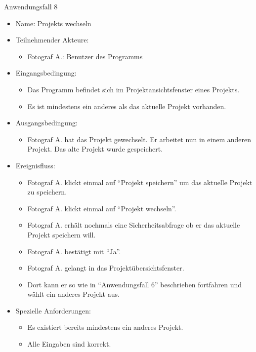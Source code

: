 \begin{itemize}
		\begin{description}
		\item[Anwendungsfall 8]
	\end{description}
	
		\begin{itemize}
			\item Name: Projekts wechseln
			\item Teilnehmender Akteure:
			\begin{itemize}
				\item	Fotograf A.: Benutzer des Programms		
			\end{itemize}
			\item Eingangsbedingung:
			\begin{itemize}
				\item	Das Programm befindet sich im Projektansichtsfenster eines Projekts.
				\item Es ist mindestens ein anderes als das aktuelle Projekt vorhanden.			
			\end{itemize}
			\item Ausgangsbedingung:
			\begin{itemize}
				\item	Fotograf A. hat das Projekt gewechselt. Er arbeitet nun in einem anderen Projekt. Das alte Projekt wurde gespeichert.
			\end{itemize}
			\item Ereignisfluss:
			\begin{itemize}
			  \item Fotograf A. klickt einmal auf "`Projekt speichern"' um das aktuelle Projekt zu speichern.
				\item Fotograf A. klickt einmal auf "`Projekt wechseln"'.
				\item Fotograf A. erhält nochmals eine Sicherheitsabfrage ob er das aktuelle Projekt speichern will.
				\item Fotograf A. bestätigt mit "`Ja"'.
				\item Fotograf A. gelangt in das Projektübersichtsfenster.
				\item Dort kann er so wie in "`Anwendungsfall 6"' beschrieben fortfahren und wählt ein anderes Projekt aus.
			\end{itemize}
			\item Spezielle Anforderungen:
			\begin{itemize}
				\item	Es existiert bereits mindestens ein anderes Projekt.
				\item Alle Eingaben sind korrekt.
			\end{itemize}			
		\end{itemize}
		

\end{itemize}
